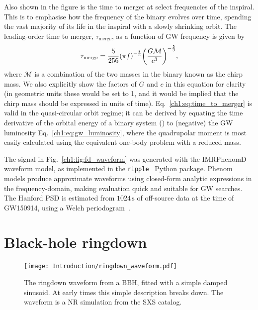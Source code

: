 Also shown in the figure is the time to merger at select frequencies of the inspiral.
This is to emphasise how the frequency of the binary evolves over time, spending the vast majority of its life in the inspiral with a slowly shrinking orbit.
The leading-order time to merger, $\tau_\mathrm{merge}$, as a function of GW frequency is given by
\begin{equation}\label{ch1:eq:time_to_merger}
    \tau_\mathrm{merge} = \frac{5}{256} \qty(\pi f)^{-\frac{8}{3}} \qty(\frac{G\mathcal{M}}{c^3})^{-\frac{5}{3}},
\end{equation}
where $\mathcal{M}$ is a combination of the two masses in the binary known as the chirp mass.
We also explicitly show the factors of $G$ and $c$ in this equation for clarity (in geometric units these would be set to 1, and it would be implied that the chirp mass should be expressed in units of time). 
Eq.~\ref{ch1:eq:time_to_merger} is valid in the quasi-circular orbit regime; it can be derived by equating the time derivative of the orbital energy of a binary system () to (negative) the GW luminosity Eq.~\ref{ch1:eq:gw_luminosity}, where the quadrupolar moment is most easily calculated using the equivalent one-body problem with a reduced mass.

The signal in Fig.~\ref{ch1:fig:fd_waveform} was generated with the IMRPhenomD~\cite{Khan:2015jqa} waveform model, as implemented in the \texttt{ripple}~\cite{Edwards:2023sak} Python package.
Phenom models produce approximate waveforms using closed-form analytic expressions in the frequency-domain, making evaluation quick and suitable for GW searches.
The Hanford PSD is estimated from $1024\,\mathrm{s}$ of off-source data at the time of GW150914, using a Welch periodogram~\cite{1161901}.


\section{Black-hole ringdown}
\label{ch1:sec:bh_ringdown}

\begin{figure}[ht!]
    \centering
    \texttt{[image: Introduction/ringdown\_waveform.pdf]}
    \caption[The gravitational-wave ringdown signal]{ 
    The ringdown waveform from a BBH, fitted with a simple damped sinusoid. 
    At early times this simple description breaks down. The waveform is a NR simulation from the SXS catalog.
    }
    \label{ch1:fig:rd_waveform}
\end{figure}

